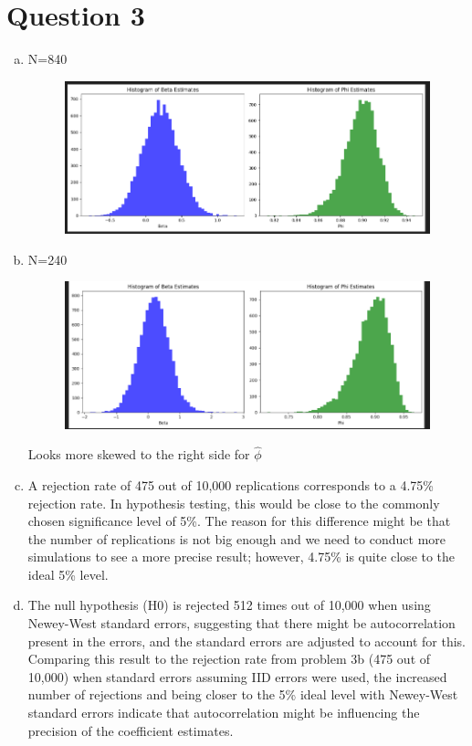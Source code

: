 
\section*{Question 3}

\begin{enumerate}[(a)]
    \item
    N=840\\
    \begin{figure}[h]
        \centering
        \includegraphics[width=0.9\linewidth]{Out/840plot.png}
        
    \end{figure}

  \item
    N=240\\
    \begin{figure}[h]
        \centering
        \includegraphics[width=0.9\linewidth]{Out/240.png}
        
    \end{figure}
Looks more skewed to the right side for $\hat{\phi}$
\item 
A rejection rate of 475 out of 10,000 replications corresponds to a 4.75\% rejection rate. In hypothesis testing, this would be close to the commonly chosen significance level of 5\%. The reason for this difference might be that the number of replications is not big enough and we need to conduct more simulations to see a more precise result; however, 4.75\% is quite close to the ideal 5\% level.

\item 
The null hypothesis (H0) is rejected 512 times out of 10,000 when using Newey-West standard errors, suggesting that there might be autocorrelation present in the errors, and the standard errors are adjusted to account for this.\\

Comparing this result to the rejection rate from problem 3b (475 out of 10,000) when standard errors assuming IID errors were used, the increased number of rejections and being closer to the 5\% ideal level with Newey-West standard errors indicate that autocorrelation might be influencing the precision of the coefficient estimates.
\end{enumerate}
